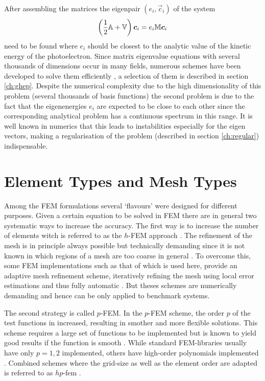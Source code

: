 After assembling the matrices the eigenpair $(e_i, \vec{c}_i)$ of the system
\begin{equation} \label{eq:SEmat2}
\left(\frac 12 \mathbb{A}+\mathbb{V}\right)\bm{c}_i = e_i \mathbb{M}\bm{c}_i
\end{equation}
need to be found where $e_i$ should be closest to the analytic value of the kinetic energy of the photoelectron.
Since matrix eigenvalue equations with several thousands of dimensions occur in many fields, numerous schemes have been developed to solve them efficiently \cite{davidson,arnoldi, gpusolver,krylov}, a selection of them is described in section \ref{ch:ghep}.
Despite the numerical complexity due to the high dimensionality of this problem (several thousands of basis functions) the second problem is due to the fact that the eigenenergies $e_i$ are expected to be close to each other since the corresponding analytical problem has a continuous spectrum in this range.
It is well known in numerics that this leads to instabilities especially for the eigen vectors, making a regularisation of the problem (described in section \ref{ch:regular}) indispensable.

\section{Element Types and Mesh Types}
\label{ch:feAss}
Among the FEM formulations several `flavours' were designed for different purposes.
Given a certain equation to be solved in FEM there are in general two systematic ways to increase the accuracy.
The first way is to increase the number of elements witch is referred to as the $h$-FEM approach \cite{dreyer,}.
The refinement of the mesh is in principle always possible but technically demanding since it is not known in which regions of a mesh are too coarse in general \cite{dreyer}.
To overcome this, some FEM implementations such as that of  \cite{libmesh} which is used here, provide an adaptive mesh refinement scheme, iteratively refining the mesh using local error estimations and thus fully automatic \cite{libmesh}.
But theses schemes are numerically demanding and hence can be only applied to benchmark systems.

The second strategy is called $p$-FEM. 
In the $p$-FEM scheme, the order $p$ of the test functions in increased, resulting in smother and more flexible solutions.
This scheme requires a large set of functions to be implemented but is known to yield good results if the function is smooth \cite{p-fem}.
While standard FEM-libraries usually have only $p=1,2$ implemented, others have high-order polynomials implemented \cite{hermes}.
Combined schemes where the grid-size as well as the element order are adapted is referred to as $hp$-fem \cite{hp-fem}.

